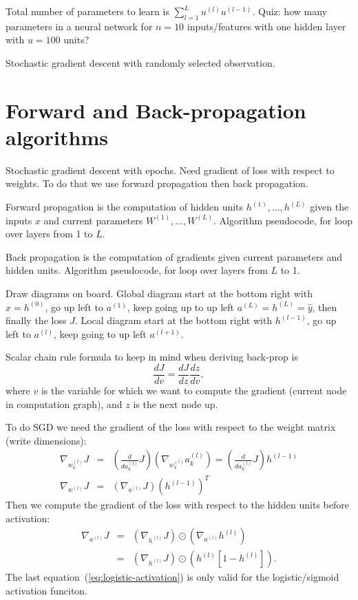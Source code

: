 \documentclass{article}
\begin{document}
Total number of parameters to learn is
$\sum_{l=1}^L u^{(l)} u^{(l-1)}.$ Quiz: how many parameters in a
neural network for $n=10$ inputs/features with one hidden layer with
$u=100$ units?

Stochastic gradient descent with randomly selected observation.

\section{Forward and Back-propagation algorithms}

Stochastic gradient descent with epochs. Need gradient of loss with
respect to weights. To do that we use forward propagation then back
propagation.

Forward propagation is the computation of hidden units
$h^{(1)},\dots,h^{(L)}$ given the inputs $x$ and current parameters
$W^{(1)},\dots,W^{(L)}$. Algorithm pseudocode, for loop over layers
from 1 to $L$.

Back propagation is the computation of gradients given current
parameters and hidden units. Algorithm pseudocode, for loop over
layers from $L$ to 1.

Draw diagrams on board. Global diagram start at the bottom right
with $x=h^{(0)}$, go up left to $a^{(1)}$, keep going up to up left
$a^{(L)}=h^{(L)}=\hat y$, then finally the loss $J$. Local diagram
start at the bottom right with $h^{(l-1)}$, go up left to $a^{(l)}$,
keep going to up left $a^{(l+1)}$.

Scalar chain rule formula to keep in mind when deriving back-prop is
\begin{equation}
  \frac{d J}{d v} = \frac{d J}{d z} \frac{d z}{d v},
\end{equation}
where $v$ is the variable for which we want to compute the gradient
(current node in computation graph), and $z$ is the next node up.

To do SGD we need the gradient of the loss with respect to the weight
matrix (write dimensions):
\begin{eqnarray}
  \nabla_{w_k^{(l)}} J
  &=& \left( \frac{d}{d a_k^{(l)}} J \right)
      \left( \nabla_{w_k^{(l)}} a_k^{(l)} \right) =
      \left( \frac{d}{d a_k^{(l)}} J \right)
      h^{(l-1)}\\
  \nabla_{w^{(l)}} J
  &=& \left(\nabla_{a^{(l)}} J\right)
      \left( h^{(l-1)} \right)^T \label{eq:grad-loss-w}
\end{eqnarray}
Then we compute the gradient of the loss with respect to the hidden
units before activation:
\begin{eqnarray}
  \nabla_{a^{(l)}} J
  &=& \left(\nabla_{h^{(l)}} J\right) \odot
      \label{eq:grad-loss-a}
      \left(\nabla_{a^{(l)}} h^{(l)} \right) \\
  &=& \left(\nabla_{h^{(l)}} J\right) \odot \left(h^{(l)}[1-h^{(l)}]\right).\label{eq:logistic-activation}
\end{eqnarray}
The last equation~(\ref{eq:logistic-activation}) is only valid for the
logistic/sigmoid activation funciton.
\end{document}
